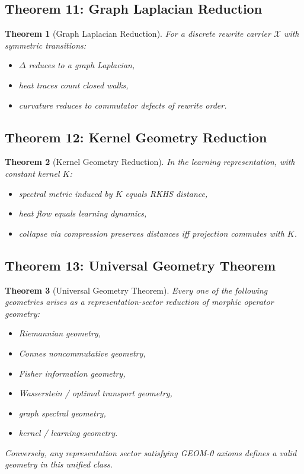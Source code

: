 \documentclass[12pt, oneside]{article}
\newtheorem{theorem}{Theorem}[section]
\begin{document}
\subsection{Theorem 11: Graph Laplacian Reduction}

\begin{theorem}[Graph Laplacian Reduction]
For a discrete rewrite carrier $\mathcal{X}$ with symmetric transitions:
\begin{itemize}
    \item $\Delta$ reduces to a graph Laplacian,
    \item heat traces count closed walks,
    \item curvature reduces to commutator defects of rewrite order.
\end{itemize}
\end{theorem}

\subsection{Theorem 12: Kernel Geometry Reduction}

\begin{theorem}[Kernel Geometry Reduction]
In the learning representation, with constant kernel $K$:
\begin{itemize}
    \item spectral metric induced by $K$ equals RKHS distance,
    \item heat flow equals learning dynamics,
    \item collapse via compression preserves distances iff projection commutes with $K$.
\end{itemize}
\end{theorem}

\subsection{Theorem 13: Universal Geometry Theorem}

\begin{theorem}[Universal Geometry Theorem]
Every one of the following geometries arises as a representation-sector reduction of morphic operator geometry:
\begin{itemize}
    \item Riemannian geometry,
    \item Connes noncommutative geometry,
    \item Fisher information geometry,
    \item Wasserstein / optimal transport geometry,
    \item graph spectral geometry,
    \item kernel / learning geometry.
\end{itemize}
Conversely, any representation sector satisfying GEOM-0 axioms defines a valid geometry in this unified class.
\end{theorem}
\end{document}
